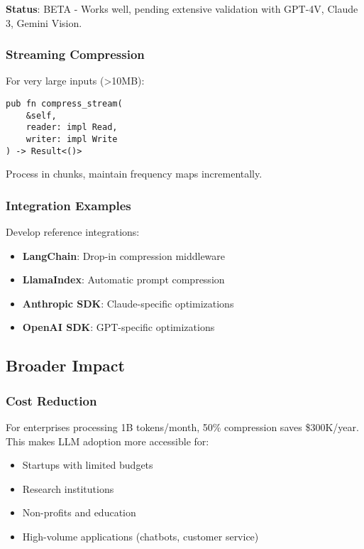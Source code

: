 \textbf{Status}: BETA - Works well, pending extensive validation with GPT-4V, Claude 3, Gemini Vision.

\subsubsection{Streaming Compression}

For very large inputs (>10MB):

\begin{verbatim}
pub fn compress_stream(
    &self,
    reader: impl Read,
    writer: impl Write
) -> Result<()>
\end{verbatim}

Process in chunks, maintain frequency maps incrementally.

\subsubsection{Integration Examples}

Develop reference integrations:

\begin{itemize}
    \item \textbf{LangChain}: Drop-in compression middleware
    \item \textbf{LlamaIndex}: Automatic prompt compression
    \item \textbf{Anthropic SDK}: Claude-specific optimizations
    \item \textbf{OpenAI SDK}: GPT-specific optimizations
\end{itemize}

\subsection{Broader Impact}

\subsubsection{Cost Reduction}

For enterprises processing 1B tokens/month, 50\% compression saves \$300K/year. This makes LLM adoption more accessible for:
\begin{itemize}
    \item Startups with limited budgets
    \item Research institutions
    \item Non-profits and education
    \item High-volume applications (chatbots, customer service)
\end{itemize}

